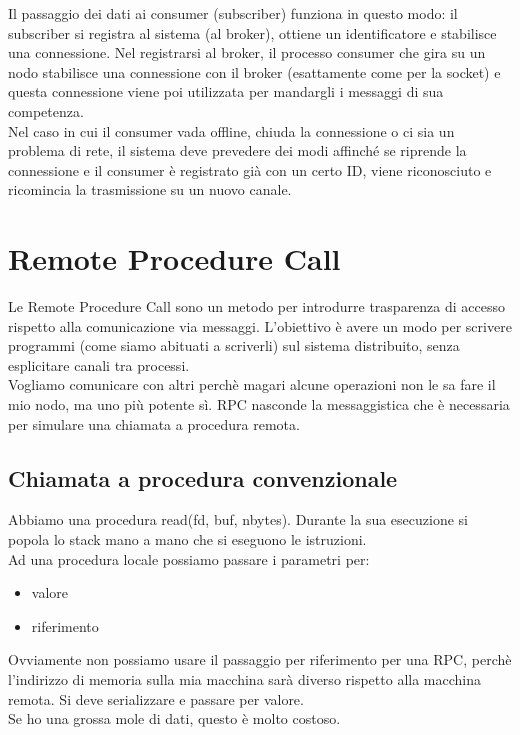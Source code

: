 Il passaggio dei dati ai consumer (subscriber) funziona in questo modo: il subscriber si registra al sistema (al broker), ottiene un identificatore e stabilisce una connessione. Nel registrarsi al broker, il processo consumer che gira su un nodo stabilisce una connessione con il broker (esattamente come per la socket) e questa connessione viene poi utilizzata per mandargli i messaggi di sua competenza. \\
Nel caso in cui il consumer vada offline, chiuda la connessione o ci sia un problema di rete, il sistema deve prevedere dei modi affinché se riprende la connessione e il consumer è registrato già con un certo ID, viene riconosciuto e ricomincia la trasmissione su un nuovo canale. \\

\section{Remote Procedure Call}
Le Remote Procedure Call sono un metodo per introdurre trasparenza di accesso rispetto alla comunicazione via messaggi.
L'obiettivo è avere un modo per scrivere programmi (come siamo abituati a scriverli) sul sistema distribuito, senza esplicitare canali tra processi.\\
Vogliamo comunicare con altri perchè magari alcune operazioni non le sa fare il mio nodo, ma uno più potente sì. 
RPC nasconde la messaggistica che è necessaria per simulare una chiamata a procedura remota.

\subsection{Chiamata a procedura convenzionale}
Abbiamo una procedura read(fd, buf, nbytes). Durante la sua esecuzione si popola lo stack mano a mano che si eseguono le istruzioni.\\
Ad una procedura locale possiamo passare i parametri per:
\begin{itemize}
    \item valore
    \item riferimento
\end{itemize}
Ovviamente non possiamo usare il passaggio per riferimento per una RPC, perchè l'indirizzo di memoria sulla mia macchina sarà diverso rispetto alla macchina remota. Si deve serializzare e passare per valore.\\ Se ho una grossa mole di dati, questo è molto costoso. 

